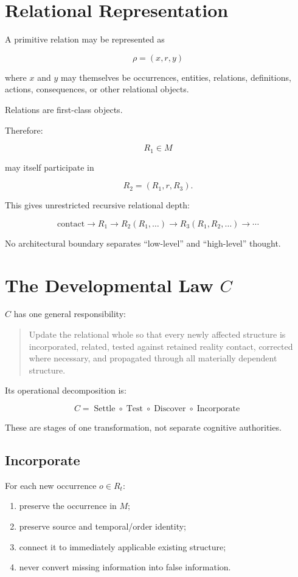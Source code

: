 \documentclass[11pt]{article}
\begin{document}
\section{Relational Representation}

A primitive relation may be represented as

\[
\rho=(x,r,y)
\]

where $x$ and $y$ may themselves be occurrences, entities, relations, definitions, actions, consequences, or other relational objects.

Relations are first-class objects.

Therefore:

\[
R_1 \in M
\]

may itself participate in

\[
R_2=(R_1,r,R_3).
\]

This gives unrestricted recursive relational depth:

\[
\boxed{
\text{contact}
\rightarrow
R_1
\rightarrow
R_2(R_1,\ldots)
\rightarrow
R_3(R_1,R_2,\ldots)
\rightarrow\cdots
}
\]

No architectural boundary separates ``low-level'' and ``high-level'' thought.

\section{The Developmental Law $C$}

$C$ has one general responsibility:

\begin{quote}
Update the relational whole so that every newly affected structure is incorporated, related, tested against retained reality contact, corrected where necessary, and propagated through all materially dependent structure.
\end{quote}

Its operational decomposition is:

\[
\boxed{
C=
\operatorname{Settle}
\circ
\operatorname{Test}
\circ
\operatorname{Discover}
\circ
\operatorname{Incorporate}
}
\]

These are stages of one transformation, not separate cognitive authorities.

\subsection{Incorporate}

For each new occurrence $o\in R_t$:

\begin{enumerate}[leftmargin=2em]
    \item preserve the occurrence in $M$;
    \item preserve source and temporal/order identity;
    \item connect it to immediately applicable existing structure;
    \item never convert missing information into false information.
\end{enumerate}
\end{document}

